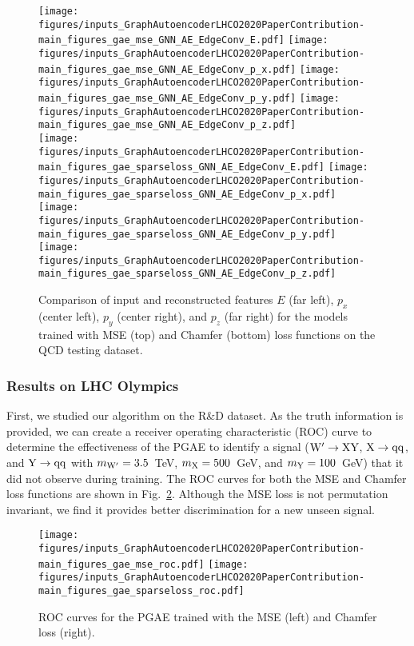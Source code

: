 \documentclass[a4paper,11pt]{article}
\begin{document}
\begin{figure}[htpb]
\centering
\texttt{[image: figures/inputs\_GraphAutoencoderLHCO2020PaperContribution-main\_figures\_gae\_mse\_GNN\_AE\_EdgeConv\_E.pdf]}
\texttt{[image: figures/inputs\_GraphAutoencoderLHCO2020PaperContribution-main\_figures\_gae\_mse\_GNN\_AE\_EdgeConv\_p\_x.pdf]}
\texttt{[image: figures/inputs\_GraphAutoencoderLHCO2020PaperContribution-main\_figures\_gae\_mse\_GNN\_AE\_EdgeConv\_p\_y.pdf]}
\texttt{[image: figures/inputs\_GraphAutoencoderLHCO2020PaperContribution-main\_figures\_gae\_mse\_GNN\_AE\_EdgeConv\_p\_z.pdf]}\\
\texttt{[image: figures/inputs\_GraphAutoencoderLHCO2020PaperContribution-main\_figures\_gae\_sparseloss\_GNN\_AE\_EdgeConv\_E.pdf]}
\texttt{[image: figures/inputs\_GraphAutoencoderLHCO2020PaperContribution-main\_figures\_gae\_sparseloss\_GNN\_AE\_EdgeConv\_p\_x.pdf]}
\texttt{[image: figures/inputs\_GraphAutoencoderLHCO2020PaperContribution-main\_figures\_gae\_sparseloss\_GNN\_AE\_EdgeConv\_p\_y.pdf]}
\texttt{[image: figures/inputs\_GraphAutoencoderLHCO2020PaperContribution-main\_figures\_gae\_sparseloss\_GNN\_AE\_EdgeConv\_p\_z.pdf]}
\caption{Comparison of input and reconstructed features $E$ (far left), $p_x$ (center left), $p_y$ (center right), and $p_z$ (far right) for the models trained with MSE (top) and Chamfer (bottom) loss functions on the QCD testing dataset.
}
\label{fig:reconstruction}
\end{figure}

\subsubsection{Results on LHC Olympics}



First, we studied our algorithm on the R\&D dataset.
As the truth information is provided, we can create a receiver operating characteristic (ROC) curve to determine the effectiveness of the PGAE to identify a signal ($\mathrm{W}^{\prime}\to\mathrm{X}\mathrm{Y}$, $\mathrm{X}\to\mathrm{q}\mathrm{q}$, and $\mathrm{Y}\to\mathrm{q}\mathrm{q}$ with $m_{\mathrm{W}^{\prime}} = 3.5$~TeV, $m_\mathrm{X} = 500$~GeV, and $m_\mathrm{Y}= 100$~GeV) that it did not observe during training.
The ROC curves for both the MSE and Chamfer loss functions are shown in Fig.~\ref{fig:rocs}.
Although the MSE loss is not permutation invariant, we find it provides better discrimination for a new unseen signal.

\begin{figure}
    \centering
    \texttt{[image: figures/inputs\_GraphAutoencoderLHCO2020PaperContribution-main\_figures\_gae\_mse\_roc.pdf]}
    \texttt{[image: figures/inputs\_GraphAutoencoderLHCO2020PaperContribution-main\_figures\_gae\_sparseloss\_roc.pdf]}
    \caption{ROC curves for the PGAE trained with the MSE (left) and Chamfer loss (right).}
    \label{fig:rocs}
\end{figure}
\end{document}
